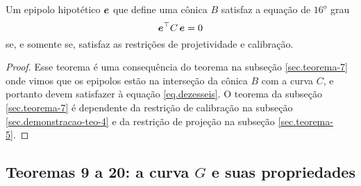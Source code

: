 \begin{teorema} 
Um epipolo hipotético $\boldsymbol{e}$ que define uma cônica $B$ satisfaz a equação de $16^{\underline{o}}$ grau 
\begin{equation}\label{eq.dezesseis}
\boldsymbol{e}^\top C\,\boldsymbol{e}=0
\end{equation}
se, e somente se, satisfaz as restrições de projetividade e calibração.
\end{teorema}
\begin{proof}
Esse teorema é uma consequência do teorema na subseção \ref{sec.teorema-7} onde vimos que os epipolos estão na interseção da cônica $B$ com a curva $C$, e portanto devem satisfazer à equação \ref{eq.dezesseis}. O teorema da subseção \ref{sec.teorema-7} é dependente da restrição de calibração na subseção \ref{sec.demonstracao-teo-4} e da restrição de projeção na subseção \ref{sec.teorema-5}. 
\end{proof}

\subsection{Teoremas 9 a 20: a curva $G$ e suas propriedades}


